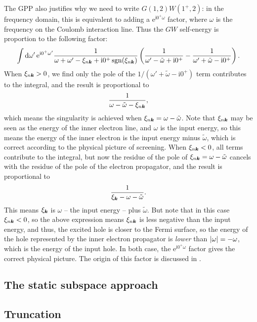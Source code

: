 \documentclass[hyperref, a4paper, 12pt]{report}
\DeclareMathOperator{\sgn}{sgn}
\newcommand*{\ii}{\mathrm{i}}
\newcommand*{\ee}{\mathrm{e}}
\begin{document}
The GPP also justifies why we need to write $G(1, 2) W(1^+, 2)$: 
in the frequency domain, 
this is equivalent to adding a $\ee^{\ii 0^+ \omega}$ factor,
where $\omega$ is the frequency on the Coulomb interaction line.
Thus the $GW$ self-energy is proportion to the following factor:
\[
    \int \dd{\omega'} \ee^{\ii 0^+ \omega'} 
    \frac{1}{\omega + \omega' - \xi_{n \vb*{k}} + \ii 0^+ \sgn(\xi_{n \vb*{k}})}
    \left(
        \frac{1}{\omega' - \tilde{\omega} + \ii 0^+}
        - \frac{1}{\omega' + \tilde{\omega} - \ii 0^+}
    \right).
\]
When $\xi_{n \vb*{k}} > 0$, we find only the pole of the $1 / (\omega' + \tilde{\omega} - \ii 0^+)$ term  
contributes to the integral, 
and the result is proportional to 
\[
    \frac{1}{\omega - \tilde{\omega} - \xi_{n \vb*{k}}},
\]
which means the singularity is achieved when 
$\xi_{n \vb*{k}} = \omega - \tilde{\omega}$.
Note that $\xi_{n \vb*{k}}$ may be seen as the energy of the inner electron line, 
and $\omega$ is the input energy, 
so this means the energy of the inner electron 
is the input energy minus $\tilde{\omega}$,
which is correct according to the physical picture of screening.
When $\xi_{n \vb*{k}} < 0$, 
all terms contribute to the integral, 
but now the residue of the pole of $\xi_{n \vb*{k}} = \omega - \tilde{\omega}$ 
cancels with the residue of the pole of the electron propagator,
and the result is proportional to 
\[
    \frac{1}{\xi_{\vb*{k}} - \omega - \tilde{\omega}}.
\]
This means $\xi_{\vb*{k}}$ is $\omega$ -- the input energy -- plus $\tilde{\omega}$.
But note that in this case $\xi_{n \vb*{k}} < 0$,
so the above expression means $\xi_{n \vb*{k}}$ is less negative than the input energy,
and thus, the excited hole is closer to the Fermi surface, 
so the energy of the hole represented by the inner electron propagator 
is \emph{lower} than $\abs{\omega} = - \omega$,
which is the energy of the input hole. 
In both case, the $\ee^{\ii 0^+ \omega}$ factor 
gives the correct physical picture. 
The origin of this factor is discussed in .

\subsection{The static subspace approach}

\subsection{Truncation}
\end{document}
